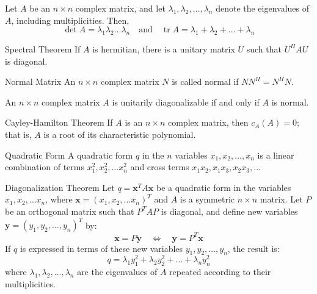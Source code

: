 \documentclass[12pt]{article}
\begin{document}
\begin{corollary}{}{}
    Let $ A $ be an $ n \times n $ complex matrix, and let $ \lambda_1, \lambda_2, \dots, \lambda_n $ denote the eigenvalues of $ A $, including multiplicities. Then,
    \[ \det A = \lambda_1 \lambda_2 \dots \lambda_n \quad \text{and} \quad \operatorname{tr} A = \lambda_1 + \lambda_2 + \dots + \lambda_n \]
\end{corollary}

\begin{theorem}{Spectral Theorem}{}
    If $ A $ is hermitian, there is a unitary matrix $ U $ such that $ U^H AU $ is diagonal.
\end{theorem}

\begin{definition}{Normal Matrix}{}
    An $ n \times n $ complex matrix $ N $ is called normal if $ N N^H = N^H N $.
\end{definition}

\begin{theorem}{}{}
    An $ n \times n $ complex matrix $ A $ is unitarily diagonalizable if and only if $ A $ is normal.
\end{theorem}

\begin{theorem}{Cayley-Hamilton Theorem}{}
    If $ A $ is an $ n \times n $ complex matrix, then $ c_A \left( A \right) = 0 $; that is, $ A $ is a root of its characteristic polynomial.
\end{theorem}

\begin{definition}{Quadratic Form}{}
    A quadratic form $ q $ in the $ n $ variables $ x_1, x_2, \dots, x_n $ is a linear combination of terms $ x_1^2, x_2^2, \dots x_n^2 $ and cross terms $ x_1 x_2, x_1 x_3, x_2 x_3, \dots $
\end{definition}

\begin{theorem}{Diagonalization Theorem}{}
    Let $ q = \mathbf{x}^T A \mathbf{x} $ be a quadratic form in the variables $ x_1, x_2, \dots x_n $, where $ \mathbf{x} = \left( x_1, x_2, \dots x_n \right)^T $ and $ A $ is a symmetric $ n \times n $ matrix. Let $ P $ be an orthogonal matrix such that $ P^T AP $ is diagonal, and define new variables $ \mathbf{y} = \left( y_1, y_2, \dots, y_n \right)^T $ by:
    \[ \mathbf{x} = P \mathbf{y} \quad \Leftrightarrow \quad \mathbf{y} = P^T \mathbf{x} \]
    If $ q $ is expressed in terms of these new variables $ y_1, y_2, \dots, y_n $, the result is:
    \[ q = \lambda_1 y_1^2 + \lambda_2 y_2^2 + \dots + \lambda_n y_n^2 \]
    where $ \lambda_1, \lambda_2, \dots, \lambda_n $ are the eigenvalues of $ A $ repeated according to their multiplicities.
\end{theorem}
\end{document}
